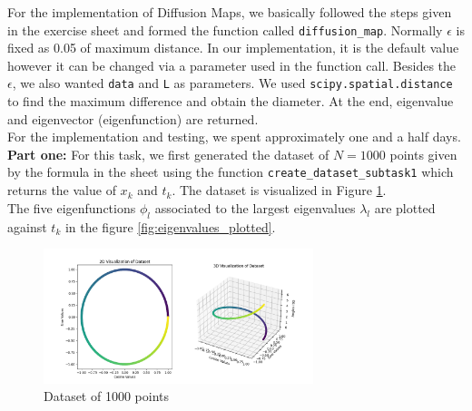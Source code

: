 For the implementation of Diffusion Maps, we basically followed the steps given in the exercise sheet and formed the function called \texttt{diffusion\_map}. Normally $\epsilon$ is fixed as 0.05 of maximum distance. In our implementation, it is the default value however it can be changed via a parameter used in the function call.  Besides the $\epsilon$, we also wanted \texttt{data} and \texttt{L} as parameters. 
We used \texttt{scipy.spatial.distance} to find the maximum difference and obtain the diameter. At the end, eigenvalue and eigenvector (eigenfunction) are returned.\\

For the implementation and testing, we spent approximately one and a half days. \\ 

\textbf{Part one:} For this task, we first generated the dataset of $N = 1000$ points given by the formula in the sheet using the function \texttt{create\_dataset\_subtask1} which returns the value of $x_k$ and $t_k$. The dataset is visualized in Figure \ref{fig:task1_dataset_fig}. \\
The five eigenfunctions $\phi_l$ associated to the largest eigenvalues $\lambda_l$ are plotted against $t_k$ in the figure \ref{fig:eigenvalues_plotted}. \\

\begin{figure}[H]
    \centering
    \includegraphics[width=0.7\textwidth]{images/ex3_task2_part1_dataset.png}
    \caption{Dataset of 1000  points}
    \label{fig:task1_dataset_fig}
\end{figure}

